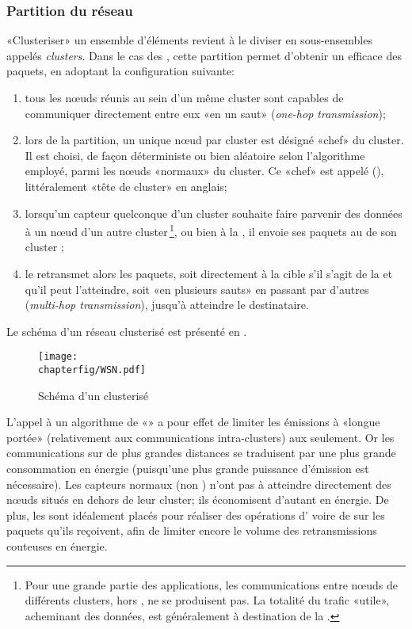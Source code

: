         \subsubsection{Partition du réseau}
«Clusteriser» un ensemble d'éléments revient à le diviser en sous-ensembles appelés \textit{clusters}.
Dans le cas des \rcsfs, cette partition permet d'obtenir un  efficace des paquets, en adoptant la configuration suivante:
\begin{enumerate}
    \item tous les nœuds réunis au sein d'un même cluster sont capables de communiquer directement entre eux «en un saut» (\textit{one-hop transmission});
    \item lors de la partition, un unique nœud par cluster est désigné «chef» du cluster.
        Il est choisi, de façon déterministe ou bien aléatoire selon l'algorithme employé, parmi les nœuds «normaux» du cluster.
        Ce «chef» est appelé \textit{\ch} (\CH), littéralement «tête de cluster» en anglais;
    \item lorsqu'un capteur quelconque d'un cluster souhaite faire parvenir des données à un nœud d'un autre cluster\,\footnote{Pour une grande partie des applications, les communications entre nœuds de différents clusters, hors \chs, ne se produisent pas. La totalité du trafic «utile», acheminant des données, est généralement à destination de la \sdb.}, ou bien à la \sdb, il envoie ses paquets au \ch de son cluster ;
    \item le \ch retransmet alors les paquets, soit directement à la cible s'il s'agit de la \sdb et qu'il peut l'atteindre, soit «en plusieurs sauts» en passant par d'autres \chs (\textit{multi-hop transmission}), jusqu'à atteindre le destinataire.
\end{enumerate}
Le schéma d'un réseau clusterisé est présenté en .
\begin{figure}[!ht]
    \centering
    \texttt{[image: \\chapterfig/WSN.pdf]}
    \caption{Schéma d'un \rc clusterisé}\label{st:fig:wsn}
\end{figure}

L'appel à un algorithme de «» a pour effet de limiter les émissions à «longue portée» (relativement aux communications intra-clusters) aux \chs seulement.
Or les communications sur de plus grandes distances se traduisent par une plus grande consommation en énergie (puisqu'une plus grande puissance d'émission est nécessaire).
Les capteurs normaux (non \chs) n'ont pas à atteindre directement des nœuds situés en dehors de leur cluster; ils économisent d'autant en énergie.
De plus, les \chs sont idéalement placés pour réaliser des opérations d' voire de  sur les paquets qu'ils reçoivent, afin de limiter encore le volume des retransmissions couteuses en énergie.

